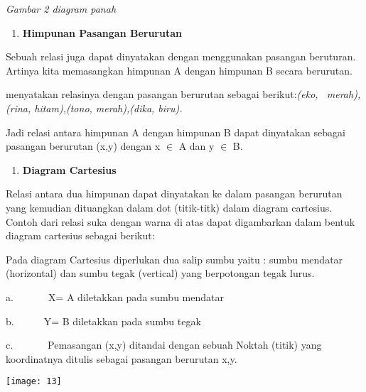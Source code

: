 \documentclass[11pt,fleqn]{book} %
\begin{document}
\noindent \textit{Gambar 2 diagram panah}

\noindent \textit{}

\begin{enumerate}
\item \textit{ }\textbf{Himpunan Pasangan Berurutan}
\end{enumerate}

\noindent 

\noindent Sebuah relasi juga dapat dinyatakan dengan menggunakan pasangan beruturan. Artinya kita memasangkan himpunan A dengan himpunan B secara berurutan.

\noindent 

\noindent 

\noindent 

\noindent 

\noindent 

\noindent 

\noindent 

\noindent menyatakan relasinya dengan pasangan berurutan sebagai berikut:\textit{(eko, ~merah), (rina, hitam),(tono, merah),(dika, biru).}

\noindent Jadi relasi antara himpunan A dengan himpunan B dapat dinyatakan sebagai pasangan berurutan (x,y) dengan x $\mathrm{\in }$ A dan y $\mathrm{\in }$ B.

\noindent 

\begin{enumerate}
\item  \textbf{Diagram Cartesius}
\end{enumerate}

\noindent Relasi antara dua himpunan dapat dinyatakan ke dalam pasangan berurutan yang kemudian dituangkan dalam dot (titik-titk) dalam diagram cartesius. Contoh dari relasi suka dengan warna di atas dapat digambarkan dalam bentuk diagram cartesius sebagai berikut:

\noindent Pada diagram Cartesius diperlukan dua salip sumbu yaitu : sumbu mendatar (horizontal) dan sumbu tegak (vertical) yang berpotongan tegak lurus.

\noindent a.~~~~~~~X= A diletakkan pada sumbu mendatar

\noindent b.~~~~~~Y= B diletakkan pada sumbu tegak

\noindent c.~~~~~~~Pemasangan (x,y) ditandai dengan sebuah Noktah (titik) yang koordinatnya ditulis sebagai pasangan berurutan x,y.

\begin{center}
\noindent \texttt{[image: 13]}
\end{center}
\end{document}
